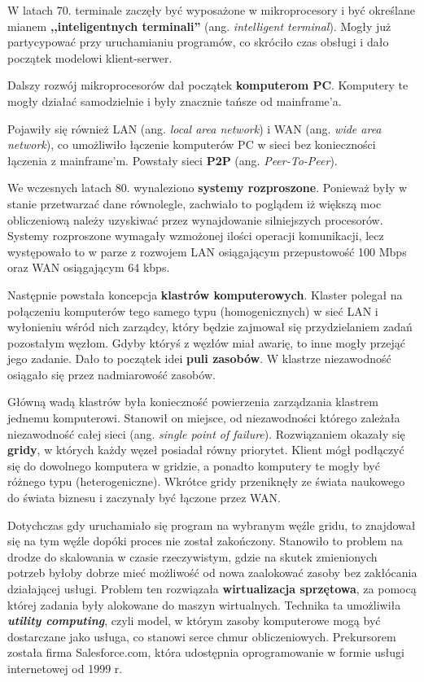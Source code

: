 \documentclass[12pt,a4paper,twoside,titlepage,openright]{book}
\begin{document}
W latach 70. terminale zaczęły być wyposażone w mikroprocesory i być określane mianem \textbf{,,inteligentnych terminali''} (ang. \textit{intelligent terminal}). Mogły już partycypować przy uruchamianiu programów, co skróciło czas obsługi i dało początek modelowi klient-serwer.

Dalszy rozwój mikroprocesorów dał początek \textbf{komputerom PC}. Komputery te mogły działać samodzielnie i były znacznie tańsze od mainframe'a.

Pojawiły się również LAN (ang. \textit{local area network}) i WAN (ang. \textit{wide area network}), co umożliwiło łączenie komputerów PC w sieci bez konieczności łączenia z mainframe'm. Powstały sieci \textbf{P2P} (ang. \textit{Peer-To-Peer}).

We wczesnych latach 80. wynaleziono \textbf{systemy rozproszone}. Ponieważ były w stanie przetwarzać dane równolegle, zachwiało to poglądem iż większą moc obliczeniową należy uzyskiwać przez wynajdowanie silniejszych procesorów. Systemy rozproszone wymagały wzmożonej ilości operacji komunikacji, lecz występowało to w parze z rozwojem LAN osiągającym przepustowość 100 Mbps oraz WAN osiągającym 64 kbps.

Następnie powstała koncepcja \textbf{klastrów komputerowych}. Klaster polegał na połączeniu komputerów tego samego typu (homogenicznych) w sieć LAN i wyłonieniu wśród nich zarządcy, który będzie zajmował się przydzielaniem zadań pozostałym węzłom. Gdyby któryś z węzłów miał awarię, to inne mogły przejąć jego zadanie. Dało to początek idei \textbf{puli zasobów}. W klastrze niezawodność osiągało się przez nadmiarowość zasobów.

Główną wadą klastrów była konieczność powierzenia zarządzania klastrem jednemu komputerowi. Stanowił on miejsce, od niezawodności którego zależała niezawodność całej sieci (ang. \textit{single point of failure}). Rozwiązaniem okazały się \textbf{gridy}, w których każdy węzeł posiadał równy priorytet. Klient mógł podłączyć się do dowolnego komputera w gridzie, a ponadto komputery te mogły być różnego typu (heterogeniczne). Wkrótce gridy przeniknęły ze świata naukowego do świata biznesu i zaczynały być łączone przez WAN.

Dotychczas gdy uruchamiało się program na wybranym węźle gridu, to znajdował się na tym węźle dopóki proces nie został zakończony. Stanowiło to problem na drodze do skalowania w czasie rzeczywistym, gdzie na skutek zmienionych potrzeb byłoby dobrze mieć możliwość od nowa zaalokować zasoby bez zakłócania działającej usługi. Problem ten rozwiązała \textbf{wirtualizacja sprzętowa}, za pomocą której zadania były alokowane do maszyn wirtualnych. Technika ta umożliwiła \textbf{\textit{utility computing}}, czyli model, w którym zasoby komputerowe mogą być dostarczane jako usługa, co stanowi serce chmur obliczeniowych. Prekursorem została firma Salesforce.com, która udostępnia oprogramowanie w formie usługi internetowej od 1999 r.
\end{document}
